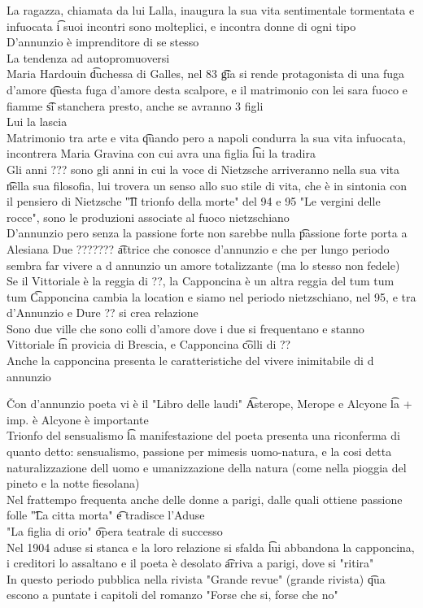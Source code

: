 \documentclass[12pt]{article}
\begin{document}
La ragazza, chiamata da lui Lalla, inaugura la sua vita sentimentale tormentata e infuocata \t i suoi incontri sono molteplici, e incontra donne di ogni tipo \\
D'annunzio è imprenditore di se stesso \\
La tendenza ad autopromuoversi \\
Maria Hardouin \t duchessa di Galles, nel 83 \t gia si rende protagonista di una fuga d'amore \t questa fuga d'amore desta scalpore, e il matrimonio con lei sara fuoco e fiamme \t si stanchera presto, anche se avranno 3 figli \\
Lui la lascia \\
Matrimonio tra arte e vita \t quando pero a napoli condurra la sua vita infuocata, incontrera Maria Gravina con cui avra una figlia \t lui la tradira \\
Gli anni ??? sono gli anni in cui la voce di Nietzsche arriveranno nella sua vita \t nella sua filosofia, lui trovera un senso allo suo stile di vita, che è in sintonia con il pensiero di Nietzsche \t "Il trionfo della morte" del 94 e 95 "Le vergini delle rocce", sono le produzioni associate al fuoco nietzschiano \\
D'annunzio pero senza la passione forte non sarebbe nulla \t passione forte porta a Alesiana Due ??????? \t attrice che conosce d'annunzio e che per lungo periodo sembra far vivere a d annunzio un amore totalizzante (ma lo stesso non fedele) \\
Se il Vittoriale è la reggia di ??, la Capponcina è un altra reggia del tum tum tum \t Capponcina cambia la location e siamo nel periodo nietzschiano, nel 95, e tra d'Annunzio e Dure ?? si crea relazione \\
Sono due ville che sono colli d'amore dove i due si frequentano e stanno \\
Vittoriale \t in provicia di Brescia, e Capponcina \t colli di ?? \\
Anche la capponcina presenta le caratteristiche del vivere inimitabile di d annunzio

\v

Con d'annunzio poeta vi è il "Libro delle laudi" \t Asterope, Merope e Alcyone \t la + imp. è Alcyone è importante \\
Trionfo del sensualismo \t la manifestazione del poeta presenta una riconferma di quanto detto: sensualismo, passione per mimesis uomo-natura, e la cosi detta naturalizzazione dell uomo e umanizzazione della natura (come nella pioggia del pineto e la notte fiesolana) \\
Nel frattempo frequenta anche delle donne a parigi, dalle quali ottiene passione folle \t "La citta morta" \t e tradisce l'Aduse \\
"La figlia di orio" \t opera teatrale di successo \\
Nel 1904 aduse si stanca e la loro relazione si sfalda \t lui abbandona la capponcina, i creditori lo assaltano e il poeta è desolato \t arriva a parigi, dove si "ritira" \\
In questo periodo pubblica nella rivista "Grande revue" (grande rivista) \t qua escono a puntate i capitoli del romanzo "Forse che si, forse che no"
\end{document}
